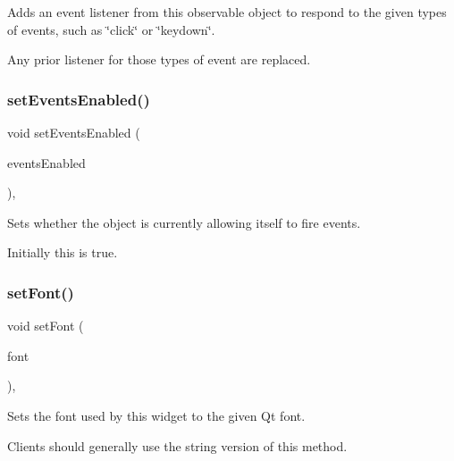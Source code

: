Adds an event listener from this observable object to respond to the given types of events, such as \char`\"{}click\char`\"{} or \char`\"{}keydown\char`\"{}. 

Any prior listener for those types of event are replaced. \mbox{\label{classsgl_1_1GObservable_afaa30b2a9e0f378fd1c70d2f1d0b8216}} 
\subsubsection{\texorpdfstring{set\+Events\+Enabled()}{setEventsEnabled()}}
{\footnotesize\ttfamily void set\+Events\+Enabled (\begin{DoxyParamCaption}\item[{bool}]{events\+Enabled }\end{DoxyParamCaption})\hspace{0.3cm}{\ttfamily [virtual]}, {\ttfamily [inherited]}}



Sets whether the object is currently allowing itself to fire events. 

Initially this is true. \mbox{\label{classsgl_1_1GInteractor_a2592348886ffea646c6534bf88f7c49d}} 
\subsubsection{\texorpdfstring{set\+Font()}{setFont()}\hspace{0.1cm}{\footnotesize\ttfamily [1/2]}}
{\footnotesize\ttfamily void set\+Font (\begin{DoxyParamCaption}\item[{const Q\+Font \&}]{font }\end{DoxyParamCaption})\hspace{0.3cm}{\ttfamily [virtual]}, {\ttfamily [inherited]}}



Sets the font used by this widget to the given Qt font. 

Clients should generally use the string version of this method. 


